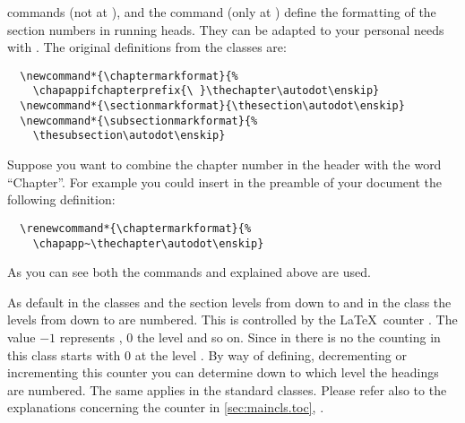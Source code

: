 commands  (not at ),
 and the command 
(only at ) define the formatting of the section numbers
in running heads. They can be adapted to your personal needs with
. The original definitions from the {\KOMAScript}
classes are:
\begin{lstlisting}
  \newcommand*{\chaptermarkformat}{%
    \chapappifchapterprefix{\ }\thechapter\autodot\enskip}
  \newcommand*{\sectionmarkformat}{\thesection\autodot\enskip}
  \newcommand*{\subsectionmarkformat}{%
    \thesubsection\autodot\enskip}
\end{lstlisting}
\begin{Example}
  Suppose you want to combine the chapter number in the header with the word
  ``Chapter''. For example you could insert in the preamble of your
  document the following definition:
\begin{lstlisting}
  \renewcommand*{\chaptermarkformat}{%
    \chapapp~\thechapter\autodot\enskip}
\end{lstlisting}
\end{Example}
As you can see both the commands  and
 explained above are used.
%
%
%
%
%
%
%


\begin{Declaration}
\end{Declaration}%
%
As default in the classes  and
 the section levels from
 down
to  and in the class
 the levels from 
down to  are numbered.
This is controlled by the \LaTeX\ counter . The
value \(-1\) represents , \(0\) the level 
and so on. Since in  there is no  the
counting in this class starts with \(0\) at the level . By
way of defining, decrementing or incrementing this counter you can
determine down to which level the headings are numbered. The same
applies in the standard classes. Please refer also to the explanations
concerning the counter  in
\autoref{sec:maincls.toc}, .
%


